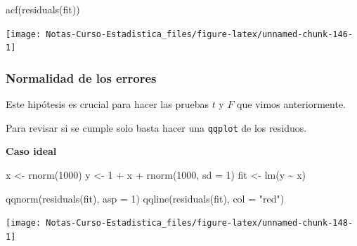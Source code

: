 \documentclass[
  12pt,
]{book}
\newenvironment{Shaded}{\begin{snugshade}}{\end{snugshade}}
\newcommand{\AttributeTok}[1]{\textcolor[rgb]{0.77,0.63,0.00}{#1}}
\newcommand{\DecValTok}[1]{\textcolor[rgb]{0.00,0.00,0.81}{#1}}
\newcommand{\FunctionTok}[1]{\textcolor[rgb]{0.00,0.00,0.00}{#1}}
\newcommand{\NormalTok}[1]{#1}
\newcommand{\OtherTok}[1]{\textcolor[rgb]{0.56,0.35,0.01}{#1}}
\newcommand{\SpecialCharTok}[1]{\textcolor[rgb]{0.00,0.00,0.00}{#1}}
\newcommand{\StringTok}[1]{\textcolor[rgb]{0.31,0.60,0.02}{#1}}
\begin{document}
\begin{Shaded}
\begin{Highlighting}[]
\FunctionTok{acf}\NormalTok{(}\FunctionTok{residuals}\NormalTok{(fit))}
\end{Highlighting}
\end{Shaded}

\begin{center}\texttt{[image: Notas-Curso-Estadistica\_files/figure-latex/unnamed-chunk-146-1]} \end{center}

\hypertarget{normalidad-de-los-errores}{%
\subsubsection{Normalidad de los
errores}\label{normalidad-de-los-errores}}

Este hipótesis es crucial para hacer las pruebas \(t\) y \(F\) que vimos
anteriormente.

Para revisar si se cumple solo basta hacer una \texttt{qqplot} de los
residuos.

\textbf{Caso ideal}

\begin{Shaded}
\begin{Highlighting}[]
\NormalTok{x }\OtherTok{\textless{}{-}} \FunctionTok{rnorm}\NormalTok{(}\DecValTok{1000}\NormalTok{)}
\NormalTok{y }\OtherTok{\textless{}{-}} \DecValTok{1} \SpecialCharTok{+}\NormalTok{ x }\SpecialCharTok{+} \FunctionTok{rnorm}\NormalTok{(}\DecValTok{1000}\NormalTok{, }\AttributeTok{sd =} \DecValTok{1}\NormalTok{)}
\NormalTok{fit }\OtherTok{\textless{}{-}} \FunctionTok{lm}\NormalTok{(y }\SpecialCharTok{\textasciitilde{}}\NormalTok{ x)}
\end{Highlighting}
\end{Shaded}

\begin{Shaded}
\begin{Highlighting}[]
\FunctionTok{qqnorm}\NormalTok{(}\FunctionTok{residuals}\NormalTok{(fit), }\AttributeTok{asp =} \DecValTok{1}\NormalTok{)}
\FunctionTok{qqline}\NormalTok{(}\FunctionTok{residuals}\NormalTok{(fit), }\AttributeTok{col =} \StringTok{"red"}\NormalTok{)}
\end{Highlighting}
\end{Shaded}

\begin{center}\texttt{[image: Notas-Curso-Estadistica\_files/figure-latex/unnamed-chunk-148-1]} \end{center}
\end{document}
